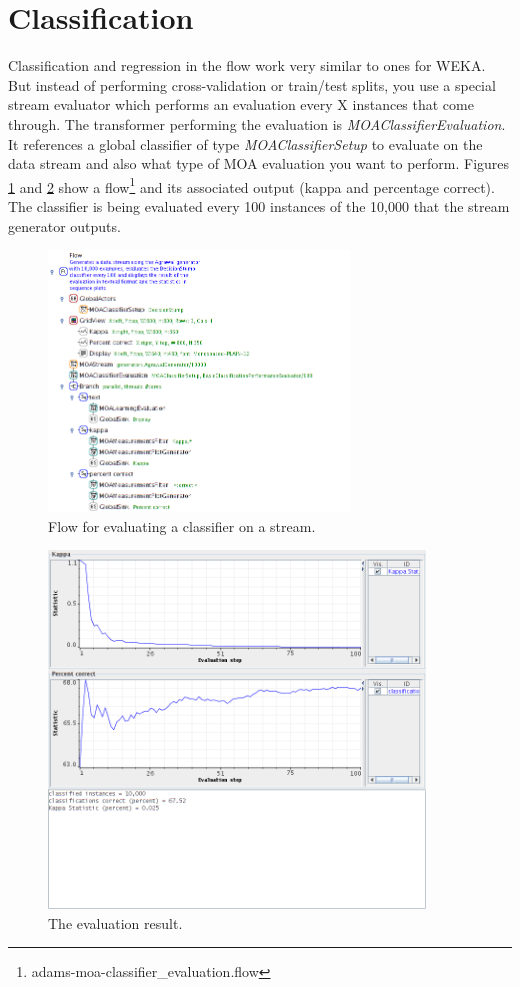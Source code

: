 \documentclass[a4paper]{book}
\begin{document}
\clearpage
\newpage
\section{Classification}
Classification and regression in the flow work very similar to ones for WEKA.
But instead of performing cross-validation or train/test splits, you use a
special stream evaluator which performs an evaluation every X instances that
come through. The transformer performing the evaluation is 
\textit{MOAClassifierEvaluation}. It references a global classifier of type 
\textit{MOAClassifierSetup} to evaluate on the data stream and also what type of MOA 
evaluation you want to perform.
Figures \ref{moa-classifier-flow} and \ref{moa-classifier-output} show a 
flow\footnote{adams-moa-classifier\_evaluation.flow} 
and its associated output (kappa and percentage correct). The classifier is 
being evaluated every 100 instances of the 10,000 that the stream generator 
outputs.

\begin{figure}[htb]
  \centering
  \includegraphics[width=8.0cm]{images/moa-classifier-flow.png}
  \caption{Flow for evaluating a classifier on a stream.}
  \label{moa-classifier-flow}
\end{figure}

\begin{figure}[htb]
  \centering
  \includegraphics[width=10.0cm]{images/moa-classifier-output.png}
  \caption{The evaluation result.}
  \label{moa-classifier-output}
\end{figure}
\end{document}
